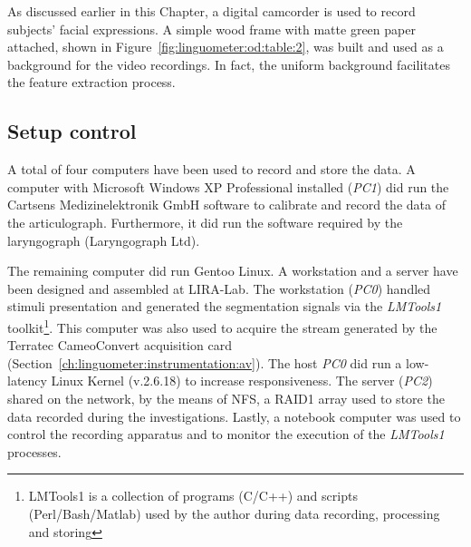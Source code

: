 As discussed earlier in this Chapter, a digital camcorder is used to record
subjects' facial expressions. A simple wood frame with matte green
paper attached, shown in Figure~\ref{fig:linguometer:od:table:2}, was built and
used as a background for the video recordings.
In fact, the uniform background facilitates the feature extraction process.
\subsection{Setup control}
\label{ch:linguometer:instrumentation:setup}
A total of four computers have been used to record and store the data.
A computer with Microsoft Windows XP Professional installed (\emph{PC1})
did run the Cartsens Medizinelektronik GmbH software to calibrate and record 
the data of the articulograph.
Furthermore, it did run the software required by the laryngograph
(Laryngograph Ltd).

The remaining computer did run Gentoo Linux. 
A workstation and a server have been designed and assembled at LIRA-Lab. 
The workstation (\emph{PC0}) handled stimuli presentation and generated the
segmentation signals via the \emph{LMTools1} 
toolkit\footnote{LMTools1 is a collection of programs (C/C++)
and scripts (Perl/Bash/Matlab) used by the author during data recording,
processing and storing}. This computer was also used to acquire the stream
generated by the Terratec CameoConvert acquisition card
(Section~\ref{ch:linguometer:instrumentation:av}).
The host \emph{PC0} did run a low-latency Linux 
Kernel (v.2.6.18) to increase responsiveness.
The server (\emph{PC2}) shared on the network, by the means of NFS,
a RAID1 array used to store the data recorded during the investigations.
Lastly, a notebook computer was used to control the recording
apparatus and to monitor the execution of the \emph{LMTools1} processes.
